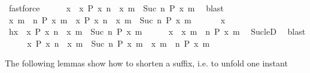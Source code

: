 \begin{isabellebody}
\ fastforce\isanewline
\ \ \ \ \isamarkupfalse%
\ {\isacartoucheopen}x\ {\isasymin}\ {\isacharbraceleft}x{\isachardot}\ P\ x\ n{\isacharbraceright}\ {\isasymunion}\ {\isacharbraceleft}x{\isachardot}\ {\isasymexists}m\ {\isasymge}\ Suc\ n{\isachardot}\ P\ x\ m{\isacharbraceright}{\isacartoucheclose}\ \isamarkupfalse%
\ blast\isanewline
\ \ \isacommand{{\isacharbraceright}}\isamarkupfalse%
\ \isamarkupfalse%
\ {\isacartoucheopen}{\isacharbraceleft}x{\isachardot}\ {\isasymexists}m\ {\isasymge}\ n{\isachardot}\ P\ x\ m{\isacharbraceright}\ {\isasymsubseteq}\ {\isacharbraceleft}x{\isachardot}\ P\ x\ n{\isacharbraceright}\ {\isasymunion}\ {\isacharbraceleft}x{\isachardot}\ {\isasymexists}m\ {\isasymge}\ Suc\ n{\isachardot}\ P\ x\ m{\isacharbraceright}{\isacartoucheclose}\ \isacommand{{\isachardot}{\isachardot}}\isamarkupfalse%
\isanewline
{}\isamarkupfalse%
\isanewline
\ \ \isacommand{{\isacharbraceleft}}\isamarkupfalse%
\ \isamarkupfalse%
\ x\ \ \isamarkupfalse%
\ h{\isacharcolon}{\isacartoucheopen}x\ {\isasymin}\ {\isacharbraceleft}x{\isachardot}\ P\ x\ n{\isacharbraceright}\ {\isasymunion}\ {\isacharbraceleft}x{\isachardot}\ {\isasymexists}m\ {\isasymge}\ Suc\ n{\isachardot}\ P\ x\ m{\isacharbraceright}{\isacartoucheclose}\isanewline
\ \ \ \ \isamarkupfalse%
\ {\isacartoucheopen}x\ {\isasymin}\ {\isacharbraceleft}x{\isachardot}\ {\isasymexists}m\ {\isasymge}\ n{\isachardot}\ P\ x\ m{\isacharbraceright}{\isacartoucheclose}\ \isamarkupfalse%
\ Suc{\isacharunderscore}leD\ \isamarkupfalse%
\ blast\isanewline
\ \ \isacommand{{\isacharbraceright}}\isamarkupfalse%
\ \isamarkupfalse%
\ {\isacartoucheopen}{\isacharbraceleft}x{\isachardot}\ P\ x\ n{\isacharbraceright}\ {\isasymunion}\ {\isacharbraceleft}x{\isachardot}\ {\isasymexists}m\ {\isasymge}\ Suc\ n{\isachardot}\ P\ x\ m{\isacharbraceright}\ {\isasymsubseteq}\ {\isacharbraceleft}x{\isachardot}\ {\isasymexists}m\ {\isasymge}\ n{\isachardot}\ P\ x\ m{\isacharbraceright}{\isacartoucheclose}\ \isacommand{{\isachardot}{\isachardot}}\isamarkupfalse%
\isanewline
{}\isamarkupfalse%
%
\endisatagproof
{\isafoldproof}%
%
\isadelimproof
%
\endisadelimproof
%
\isadelimdocument
%
\endisadelimdocument
%
\isatagdocument
%
\isamarkuptrue%
%
\endisatagdocument
{\isafolddocument}%
%
\isadelimdocument
%
\endisadelimdocument
%
\begin{isamarkuptext}%
The following lemmas show how  to shorten a suffix, i.e. to unfold one instant 

\end{isamarkuptext}
\end{isabellebody}
